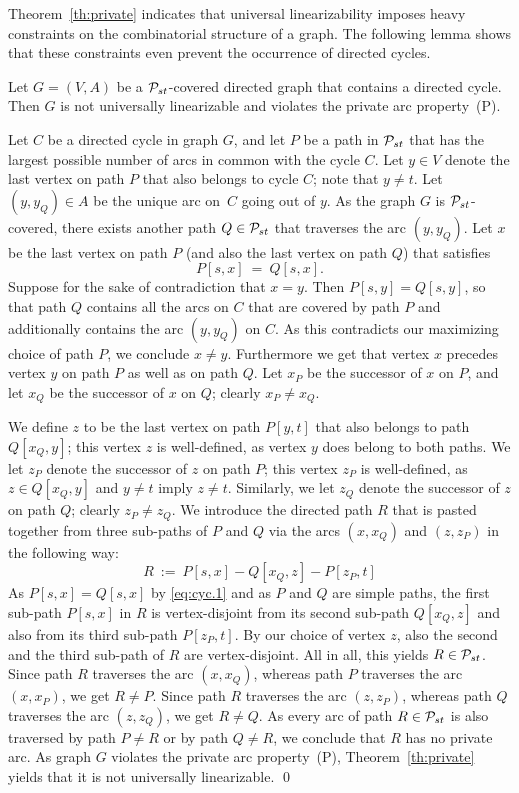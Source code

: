 \documentclass[11pt,fleqn]{article}
\begin{document}
\bigskip
Theorem~\ref{th:private} indicates that universal linearizability imposes heavy 
constraints on the combinatorial structure of a graph.
The following lemma shows that these constraints even prevent the occurrence of directed cycles.
\begin{lemma}
\label{le:no-cycle}
Let $G=(V,A)$ be a ${\cal P}_{st}$-covered directed graph that contains a directed cycle.
Then $G$ is not universally linearizable and violates the private arc property~(P).
\end{lemma}
\proof
Let $C$ be a directed cycle in graph $G$, and let $P$ be a path in ${\cal P}_{st}$ that has the 
largest possible number of arcs in common with the cycle $C$.
Let $y\in V$ denote the last vertex on path $P$ that also belongs to cycle $C$; note that $y\ne t$.
Let $(y,y_Q)\in A$ be the unique arc on~$C$ going out of $y$. 
As the graph $G$ is ${\cal P}_{st}$-covered, there exists another path $Q\in{\cal P}_{st}$ that traverses the arc $(y,y_Q)$.
Let $x$ be the last vertex on path $P$ (and also the last vertex on path $Q$) that satisfies
\begin{equation}
\label{eq:cyc.1}
P[s,x] ~=~ Q[s,x].
\end{equation}
Suppose for the sake of contradiction that $x=y$.
Then $P[s,y]=Q[s,y]$, so that path $Q$ contains all the arcs on $C$ that are covered by path $P$ 
and additionally contains the arc $(y,y_Q)$ on $C$.
As this contradicts our maximizing choice of path $P$, we conclude $x\ne y$.
Furthermore we get that vertex $x$ precedes vertex $y$ on path $P$ as well as on path $Q$.
Let $x_P$  be the successor of $x$ on $P$, and 
let $x_Q$  be the successor of $x$ on $Q$; clearly $x_P\ne x_Q$.

We define $z$ to be the last vertex on path $P[y,t]$ that also belongs to path $Q[x_Q,y]$;
this vertex $z$ is well-defined, as vertex $y$ does belong to both paths.
We let $z_P$ denote the successor of $z$ on path $P$; this vertex $z_P$ is well-defined, as 
$z\in Q[x_Q,y]$ and $y\ne t$ imply $z\ne t$.
Similarly, we let $z_Q$ denote the successor of $z$ on path $Q$; clearly $z_P\ne z_Q$.
We introduce the directed path $R$ that is pasted together from three sub-paths of $P$ and $Q$ 
via the arcs $(x,x_Q)$ and $(z,z_P)$ in the following way:
\begin{equation}
\label{eq:cyc.2}
R ~:=~ P[s,x] - Q[x_Q,z] - P[z_P,t] 
\end{equation}
As $P[s,x]=Q[s,x]$ by \eqref{eq:cyc.1} and as $P$ and $Q$ are simple paths, the first 
sub-path $P[s,x]$ in $R$ is vertex-disjoint from its second sub-path $Q[x_Q,z]$ and 
also from its third sub-path $P[z_P,t]$.
By our choice of vertex $z$, also the second and the third sub-path of $R$ are vertex-disjoint.
All in all, this yields $R\in{\cal P}_{st}$.
Since path $R$ traverses the arc $(x,x_Q)$, whereas path $P$ traverses the arc $(x,x_P)$, we get $R\ne P$.
Since path $R$ traverses the arc $(z,z_P)$, whereas path $Q$ traverses the arc $(z,z_Q)$, we get $R\ne Q$.
As every arc of path $R\in{\cal P}_{st}$ is also traversed by path $P\ne R$ or by path $Q\ne R$, 
we conclude that $R$ has no private arc.
As graph $G$ violates the private arc property~(P), Theorem~\ref{th:private} yields that it 
is not universally linearizable.
\qed
\end{document}
